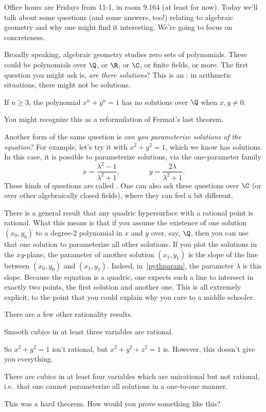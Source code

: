 Office hours are Fridays from 11-1, in room 9.164 (at least for now). Today we'll talk about some questions (and
some answers, too!) relating to algebraic geometry and why one might find it interesting. We're going to focus on
concreteness.

Broadly speaking, algebraic geometry studies zero sets of polynomials. These could be polynomials over $\Q$, or
$\R$, or $\C$, or finite fields, or more. The first question you might ask is, \emph{are there solutions}? This is
an : in arithmetic situations, there might not be solutions.
\begin{exm}
If $n\ge 3$, the polynomial $x^n+y^n=1$ has no solutions over $\Q$ when $x,y\ne 0$.
\end{exm}
You might recognize this as a reformulation of Fermat's last theorem.

Another form of the same question is \emph{can you parameterize solutions of the equation}? For example, let's try
it with $x^2+y^2 = 1$, which we know has solutions. In this case, it is possible to parameterize solutions, via the
one-parameter family
\begin{equation}
\label{pythparam}
	x = \frac{\lambda^2-1}{\lambda^2+1}, \qquad\qquad y = \frac{2\lambda}{\lambda^2+1}.
\end{equation}
These kinds of questions are called . One can also ask these questions over $\C$ (or
over other algebraically closed fields), where they can feel a bit different.

There is a general result that any quadric hypersurface with a rational point is rational. What this means is that
if you assume the existence of one solution $(x_0,y_0)$ to a degree-2 polynomial in $x$ and $y$ over, say, $\Q$,
then you can use that one solution to parameterize all other solutions. If you plot the solutions in the
$xy$-plane, the parameter of another solution $(x_1,y_1)$ is the slope of the line between $(x_0,y_0)$ and
$(x_1,y_1)$. Indeed, in~\eqref{pythparam}, the parameter $\lambda$ is this slope. Because the equation is a
quadric, one expects such a line to intersect in exactly two points, the first solution and another one.  This is
all extremely explicit, to the point that you could explain why you care to a middle schooler.

There are a few other rationality results.
\begin{thm}
Smooth cubics in at least three variables are rational.
\end{thm}
So $x^2+y^2 = 1$ isn't rational, but $x^2+y^2+z^2 = 1$ is. However, this doesn't give you everything.
\begin{thm}
There are cubics in at least four variables which are unirational but not rational, i.e.\ that one cannot
parameterize all solutions in a one-to-one manner.
\end{thm}
This was a hard theorem. How would you prove something like this?

